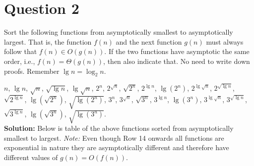 \documentclass[11pt]{article}
\begin{document}
\clearpage
\section{Question 2}

Sort the following functions from asymptotically smallest to asymptotically largest. That is, the function $f(n)$ and the next function $g(n)$ must always follow that $f(n) \in O(g(n))$. If the two functions have asymptotic the same order, i.e., $f(n)=\Theta(g(n))$, then also indicate that. No need to write down proofs.  Remember $\lg n=\log_2 n$.
  
$n$, $\lg n$, $\sqrt{n}$, $\sqrt{\lg n}$, $\lg \sqrt{n}$, $2^n$, $2^{\sqrt{n}}$, $\sqrt{2^n}$, $2^{\lg n}$, $\lg(2^n)$, $2^{\lg \sqrt{n}}$, $2^{\sqrt{\lg n}}$, $\sqrt{2^{\lg n}}$, $\lg (\sqrt{2^n})$, $\sqrt{\lg (2^n)}$,  $3^n$, $3^{\sqrt{n}}$, $\sqrt{3^n}$, $3^{\lg n}$, $\lg(3^n)$, $3^{\lg \sqrt{n}}$, $3^{\sqrt{\lg n}}$, $\sqrt{3^{\lg n}}$, $\lg (\sqrt{3^n})$, $\sqrt{\lg (3^n)}$. \\

\textbf{Solution:} Below is table of the above functions sorted from asymptotically smallest to largest. \textit{Note:} Even though Row 14 onwards all functions are exponential in nature they are asymptotically different and therefore have different values of $g(n)=O(f(n))$.

\newcommand\rownumber{\stepcounter{rownumbers}\arabic{rownumbers}}
\end{document}
